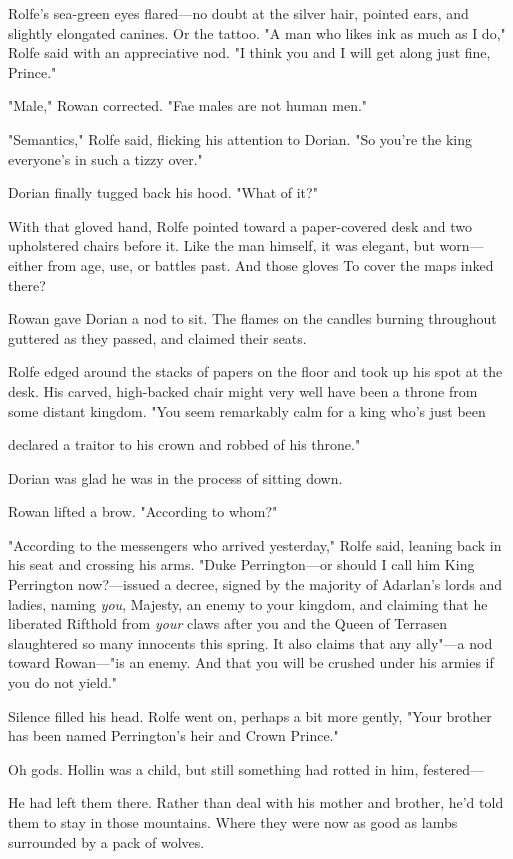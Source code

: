 Rolfe's sea-green eyes flared---no doubt at the silver hair, pointed ears, and slightly elongated canines. Or the tattoo. "A man who likes ink as much as I do," Rolfe said with an appreciative nod. "I think you and I will get along just fine, Prince."

"Male," Rowan corrected. "Fae males are not human men."

"Semantics," Rolfe said, flicking his attention to Dorian. "So you're the king everyone's in such a tizzy over."

Dorian finally tugged back his hood. "What of it?"

With that gloved hand, Rolfe pointed toward a paper-covered desk and two upholstered chairs before it. Like the man himself, it was elegant, but worn--- either from age, use, or battles past. And those gloves 
To cover the maps inked there?

Rowan gave Dorian a nod to sit. The flames on the candles burning throughout guttered as they passed, and claimed their seats.

Rolfe edged around the stacks of papers on the floor and took up his spot at the desk. His carved, high-backed chair might very well have been a throne from some distant kingdom. "You seem remarkably calm for a king who's just been

declared a traitor to his crown and robbed of his throne."

Dorian was glad he was in the process of sitting down.

Rowan lifted a brow. "According to whom?"

"According to the messengers who arrived yesterday," Rolfe said, leaning back in his seat and crossing his arms. "Duke Perrington---or should I call him King Perrington now?---issued a decree, signed by the majority of Adarlan's lords and ladies, naming \emph{you}, Majesty, an enemy to your kingdom, and claiming that he liberated Rifthold from
\emph{your} claws after you and the Queen of Terrasen slaughtered so many innocents this spring. It also claims that any ally"---a nod toward Rowan---"is an enemy. And that you will be crushed under his armies if you do not yield."

Silence filled his head. Rolfe went on, perhaps a bit more gently, "Your brother has been named Perrington's heir and Crown Prince."

Oh gods. Hollin was a child, but still  something had rotted in him, festered---

He had left them there. Rather than deal with his mother and brother, he'd told them to stay in those mountains. Where they were now as good as lambs surrounded by a pack of wolves.

